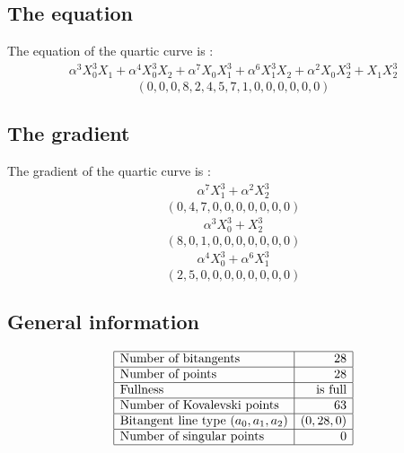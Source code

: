 \subsection*{The equation}
The equation of the quartic curve  is :
$$
\begin{array}{c}
\alpha^{3}X_0^3X_1 + \alpha^{4}X_0^3X_2 + \alpha^{7}X_0X_1^3 + \alpha^{6}X_1^3X_2 + \alpha^{2}X_0X_2^3 + X_1X_2^3\end{array}
$$
$$
( 0, 0, 0, 8, 2, 4, 5, 7, 1, 0, 0, 0, 0, 0, 0 )$$
\subsection*{The gradient}
The gradient of the quartic curve  is :
$$
\begin{array}{c}
\alpha^{7}X_1^3 + \alpha^{2}X_2^3\end{array}
$$
$$
( 0, 4, 7, 0, 0, 0, 0, 0, 0, 0 )$$
$$
\begin{array}{c}
\alpha^{3}X_0^3 + X_2^3\end{array}
$$
$$
( 8, 0, 1, 0, 0, 0, 0, 0, 0, 0 )$$
$$
\begin{array}{c}
\alpha^{4}X_0^3 + \alpha^{6}X_1^3\end{array}
$$
$$
( 2, 5, 0, 0, 0, 0, 0, 0, 0, 0 )$$
\subsection*{General information}
{\renewcommand{\arraystretch}{1.5}
$$
\begin{array}{|l|r|}
\hline
\mbox{Number of bitangents} & 28\\
\hline
\mbox{Number of points} & 28\\
\hline
\mbox{Fullness} &  \mbox{is full}\\
\hline
\mbox{Number of Kovalevski points} & 63\\
\hline
\mbox{Bitangent line type $(a_0,a_1,a_2)$} & (0,
28,
0)\\
\hline
\mbox{Number of singular points} & 0\\
\hline
\end{array}
$$}
